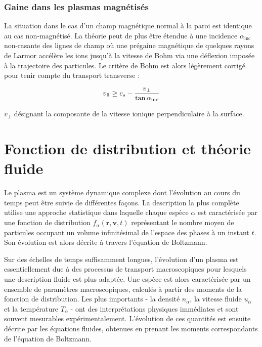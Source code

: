 \begin{refsection}



\subsubsection{Gaine dans les plasmas magnétisés}
La situation dans le cas d'un champ magnétique normal à la paroi est
identique au cas non-magnétisé. La théorie peut de plus être étendue 
à une incidence $\alpha_\text{inc}$ non-rasante des lignes de champ où une
prégaine magnétique de quelques rayons de Larmor accélère les ions jusqu'à la
vitesse de Bohm via une déflexion imposée à la trajectoire des particules. Le
critère de Bohm est alors légèrement corrigé pour tenir compte du transport transverse
\cite{Stangeby} :

\begin{equation}
	v_\para\geq
	c_{s}-\frac{v_\perp}{\tan{\alpha_\text{inc}}}
\end{equation}
 
 $v_\perp$ désignant la composante de la vitesse ionique perpendiculaire à la
 surface. 
 
 

\section{Fonction de distribution et théorie fluide}
\label{Maxwell-Boltzmann}

Le plasma est un système dynamique complexe dont l'évolution au cours du temps
peut être suivie de différentes façons. La description la plus complète utilise
une approche statistique dans laquelle chaque espèce $\alpha$ est caractérisée
par une fonction de distribution $f_\alpha(\mathbf{r},\mathbf{v},t)$
représentant le nombre moyen de particules occupant un volume infinitésimal
de l'espace des phases à un instant $t$. Son évolution est alors décrite à
travers l'équation de Boltzmann.

Sur des échelles de temps suffisamment longues, l'évolution d'un plasma est 
essentiellement due à des processus de transport macroscopiques pour lesquels
une description fluide est plus adaptée. Une espèce est alors
caractérisée par un ensemble de paramètres macroscopiques, calculés à
partir des moments de la fonction de distribution. Les plus importants -
la densité $n_\alpha$, la vitesse fluide $u_\alpha$ et la température $T_\alpha$
- ont des interprétations physiques immédiates et sont souvent mesurables
expérimentalement. L'évolution de ces quantités est ensuite décrite par les
équations fluides, obtenues en prenant les moments correspondants de l'équation de Boltzmann.


\end{refsection}
